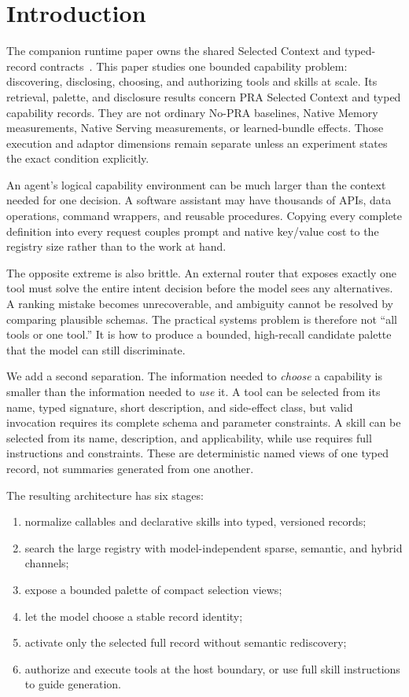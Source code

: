 \documentclass[11pt]{article}
\begin{document}
\section{Introduction}

The companion runtime paper owns the shared Selected Context and typed-record
contracts~\cite{praruntime}. This paper studies one bounded capability problem:
discovering, disclosing, choosing, and authorizing tools and skills at scale.
Its retrieval, palette, and disclosure results concern PRA Selected Context and
typed capability records. They are not ordinary No-PRA baselines, Native
Memory measurements, Native Serving measurements, or learned-bundle effects.
Those execution and adaptor dimensions remain separate unless an experiment
states the exact condition explicitly.

An agent's logical capability environment can be much larger than the context
needed for one decision. A software assistant may have thousands of APIs, data
operations, command wrappers, and reusable procedures. Copying every complete
definition into every request couples prompt and native key/value cost to the
registry size rather than to the work at hand.

The opposite extreme is also brittle. An external router that exposes exactly
one tool must solve the entire intent decision before the model sees any
alternatives. A ranking mistake becomes unrecoverable, and ambiguity cannot be
resolved by comparing plausible schemas. The practical systems problem is
therefore not ``all tools or one tool.'' It is how to produce a bounded,
high-recall candidate palette that the model can still discriminate.

We add a second separation. The information needed to \emph{choose} a
capability is smaller than the information needed to \emph{use} it. A tool can
be selected from its name, typed signature, short description, and side-effect
class, but valid invocation requires its complete schema and parameter
constraints. A skill can be selected from its name, description, and
applicability, while use requires full instructions and constraints. These are
deterministic named views of one typed record, not summaries generated from one
another.

The resulting architecture has six stages:
\begin{enumerate}[leftmargin=*]
  \item normalize callables and declarative skills into typed, versioned
  records;
  \item search the large registry with model-independent sparse, semantic, and
  hybrid channels;
  \item expose a bounded palette of compact selection views;
  \item let the model choose a stable record identity;
  \item activate only the selected full record without semantic rediscovery;
  \item authorize and execute tools at the host boundary, or use full skill
  instructions to guide generation.
\end{enumerate}
\end{document}
